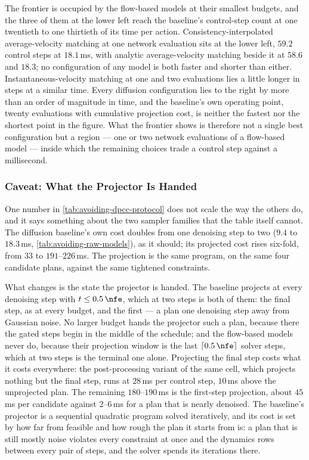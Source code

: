 The frontier is occupied by the flow-based models at their smallest budgets, and the three of them at
the lower left reach the baseline's control-step count at one twentieth to one thirtieth of its time per
action. Consistency-interpolated average-velocity matching at one network evaluation sits at the lower
left, $59.2$ control steps at $18.1$\,ms, with analytic average-velocity matching beside it at $58.6$
and $18.3$; no configuration of any model is both faster and shorter than either.
Instantaneous-velocity matching at one and two evaluations lies a little longer in steps at a similar
time. Every diffusion configuration lies to the right by more than an order of magnitude in time, and
the baseline's own operating point, twenty evaluations with cumulative projection cost, is neither the
fastest nor the shortest point in the figure.
What the frontier shows is therefore not a single best configuration but a region --- one or two network
evaluations of a flow-based model --- inside which the remaining choices trade a control step against a
millisecond.

\subsubsection{Caveat: What the Projector Is Handed}\label{sec:res:avoiding:caveat:noise}

One number in \autoref{tab:avoiding-dpcc-protocol} does not scale the way the others do, and it says
something about the two sampler families that the table itself cannot. The diffusion baseline's own cost
doubles from one denoising step to two ($9.4$ to $18.3$\,ms, \autoref{tab:avoiding-raw-models}), as it
should; its projected cost rises six-fold, from $33$ to $191$--$226$\,ms. The projection is the same
program, on the same four candidate plans, against the same tightened constraints.

What changes is the state the projector is handed. The baseline projects at every denoising step with
$t \le 0.5\,\nfe$, which at two steps is both of them: the final step, as at every budget, and the first
--- a plan one denoising step away from Gaussian noise. No larger budget hands the projector such a plan,
because there the gated steps begin in the middle of the schedule; and the flow-based models never do,
because their projection window is the last $\lceil 0.5\,\nfe \rceil$ solver steps, which at two steps
is the terminal one alone. Projecting the final step costs what it costs everywhere: the post-processing
variant of the same cell, which projects nothing but the final step, runs at $28$\,ms per control step,
$10$\,ms above the unprojected plan. The remaining $180$--$190$\,ms is the first-step projection,
about $45$\,ms per candidate against $2$--$6$\,ms for a plan that is nearly denoised. The baseline's
projector is a sequential quadratic program solved iteratively, and its cost is set by how far from
feasible and how rough the plan it starts from is: a plan that is still mostly noise violates every
constraint at once and the dynamics rows between every pair of steps, and the solver spends its
iterations there.

